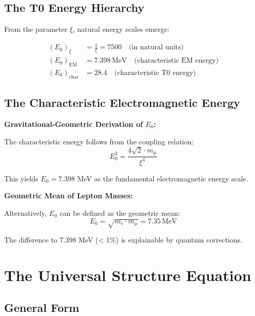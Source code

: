 \documentclass[12pt,a4paper]{article}
\begin{document}
	\subsection{The T0 Energy Hierarchy}
	
	From the parameter $\xi$, natural energy scales emerge:
	
	\begin{align}
		(E_0)_{\xi} &= \frac{1}{\xi} = 7500 \quad \text{(in natural units)} \\
		(E_0)_{\text{EM}} &= 7.398\,\mathrm{MeV} \quad \text{(characteristic EM energy)} \\
		(E_0)_{\text{char}} &= 28.4 \quad \text{(characteristic T0 energy)}
	\end{align}
	
	\subsection{The Characteristic Electromagnetic Energy}
	
	\begin{keyresult}
		\textbf{Gravitational-Geometric Derivation of $E_0$:}
		
		The characteristic energy follows from the coupling relation:
		\begin{equation}
			E_0^2 = \frac{4\sqrt{2} \cdot m_\mu}{\xi^4}
		\end{equation}
		
		This yields $E_0 = 7.398$ MeV as the fundamental electromagnetic energy scale.
	\end{keyresult}
	
	\begin{alternative}
		\textbf{Geometric Mean of Lepton Masses:}
		
		Alternatively, $E_0$ can be defined as the geometric mean:
		\begin{equation}
			E_0 = \sqrt{m_e \cdot m_\mu} = 7.35\,\mathrm{MeV}
		\end{equation}
		
		The difference to 7.398 MeV (< 1\%) is explainable by quantum corrections.
	\end{alternative}
	
	\section{The Universal Structure Equation}
	
	\subsection{General Form}
	
\end{document}

